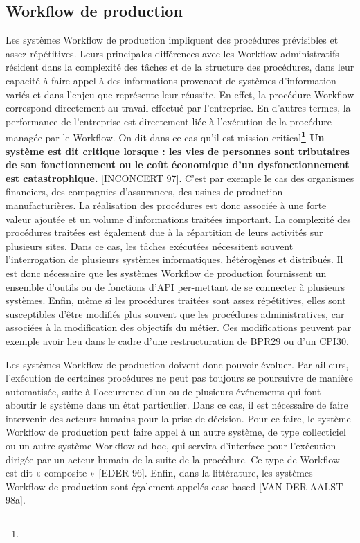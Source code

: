 \subsection{Workflow de production} 
Les systèmes Workflow de production impliquent des procédures prévisibles et assez répétitives. Leurs principales différences avec les Workflow administratifs résident dans la
complexité des tâches et de la structure des procédures, dans leur capacité à faire appel à des
informations provenant de systèmes d’information variés et dans l’enjeu que représente leur
réussite. En effet, la procédure Workflow correspond directement au travail effectué par
l’entreprise. En d’autres termes, la performance de l’entreprise est directement liée à
l’exécution de la procédure managée par le Workflow. On dit dans ce cas qu’il est mission
critical\textbf{\footnote{\samepage}  Un système est dit critique lorsque : les vies de personnes sont tributaires de son fonctionnement ou le coût économique d'un dysfonctionnement est catastrophique. } [INCONCERT 97]. C’est par exemple le cas des organismes financiers, des compagnies d’assurances, des usines de production manufacturières. La réalisation des procédures
est donc associée à une forte valeur ajoutée et un volume d’informations traitées important.
La complexité des procédures traitées est également due à la répartition de leurs activités
sur plusieurs sites. Dans ce cas, les tâches exécutées nécessitent souvent l’interrogation de
plusieurs systèmes informatiques, hétérogènes et distribués. Il est donc nécessaire que les systèmes Workflow de production fournissent un ensemble d’outils ou de fonctions d’API per-mettant de se connecter à plusieurs systèmes. Enfin, même si les procédures traitées sont assez répétitives, elles sont susceptibles d’être modifiés plus souvent que les procédures administratives, car associées à la modification des objectifs du métier. Ces modifications peuvent
par exemple avoir lieu dans le cadre d’une restructuration de BPR29 ou d’un CPI30. 

Les systèmes Workflow de production doivent donc pouvoir évoluer. Par ailleurs,
l’exécution de certaines procédures ne peut pas toujours se poursuivre de manière automatisée, suite à l’occurrence d’un ou de plusieurs événements qui font aboutir le système dans un
état particulier. Dans ce cas, il est nécessaire de faire intervenir des acteurs humains pour la
prise de décision. Pour ce faire, le système Workflow de production peut faire appel à un autre système, de type collecticiel ou un autre système Workflow ad hoc, qui servira d’interface
pour l’exécution dirigée par un acteur humain de la suite de la procédure. Ce type de Workflow est dit « composite » [EDER 96]. Enfin, dans la littérature, les systèmes Workflow de
production sont également appelés case-based [VAN DER AALST 98a]. 

